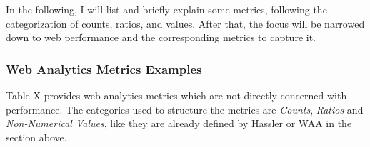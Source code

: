 In the following, I will list and briefly explain some metrics, following the categorization of counts, ratios, and values.
After that, the focus will be narrowed down to web performance and the corresponding metrics to capture it.




\subsubsection{Web Analytics Metrics Examples}


Table X provides web analytics metrics which are not directly concerned with performance.
The categories used to structure the metrics are \textit{Counts}, \textit{Ratios} and \textit{Non-Numerical Values}, like they are already defined by Hassler or WAA in the section above. %





